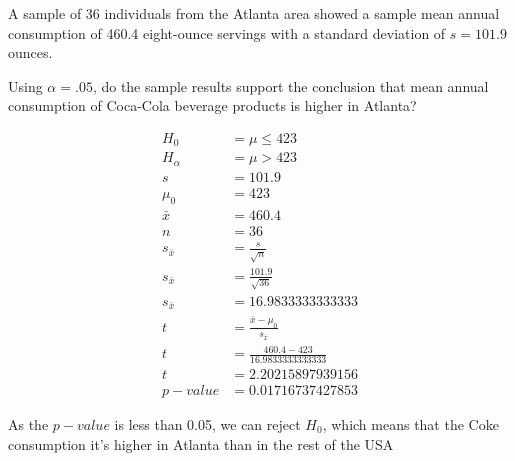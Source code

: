 \documentclass{article}
\begin{document}
A sample of 36 individuals from the Atlanta area showed a sample mean annual consumption of 460.4 eight-ounce servings with a standard deviation of $s = 101.9$ ounces.

Using $\alpha = .05$, do the sample results support the conclusion that mean annual consumption of Coca-Cola beverage products is higher in Atlanta?

\begin{align*}
  H_{0} &= \mu \leq 423\\
  H_{\alpha} &= \mu > 423 \\
  s &= 101.9\\
  \mu_{0} &= 423\\
  \bar{x} &= 460.4\\
  n &= 36\\
  s_{\bar{x}} &= \frac{s}{\sqrt{n}}\\
  s_{\bar{x}} &= \frac{101.9}{\sqrt{36}}\\
  s_{\bar{x}} &= 16.9833333333333\\
  t &= \frac{\bar{x} - \mu_{0}}{s_{\bar{x}}}\\
  t &= \frac{460.4 - 423}{16.9833333333333}\\
  t &= 2.20215897939156\\
  p-value &= 0.01716737427853
\end{align*}

As the $p-value$ is less than 0.05, we can reject $H_{0}$, which means that the Coke consumption it's higher in Atlanta than in the rest of the USA
\end{document}
